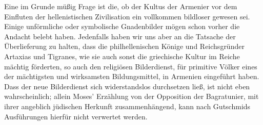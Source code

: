 \documentclass{article}
\begin{document}
Eine im Grunde müßig Frage ist die, ob der Kultus der Armenier vor dem Einfluten der hellenistischen Zivilisation ein vollkommen bildloser gewesen sei. Einige unförmliche oder symbolische Gnadenbilder mögen schon vorher die Andacht belebt haben. Jedenfalls haben wir uns aber an die Tatsache der Überlieferung zu halten, dass die philhellenischen Könige und Reichsgründer Artaxias und Tigranes, wie sie auch sonst die griechische Kultur im Reiche mächtig förderten, so auch den religiösen Bilderdienst, für primitive Völker eines der mächtigsten und wirksamsten Bildungsmittel, in Armenien eingeführt haben. Dass der neue Bilderdienst sich widerstandslos durchsetzen ließ, ist nicht eben wahrscheinlich; allein Moses' Erzählung von der Opposition der Bagratunier, mit ihrer angeblich jüdischen Herkunft zusammenhängend, kann nach Gutschmids Ausführungen hierfür nicht verwertet werden.
\end{document}
